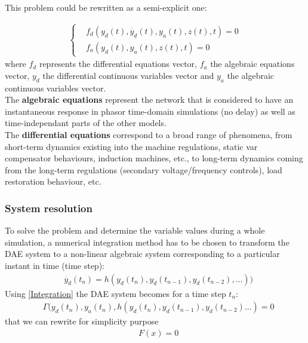 \documentclass[a4paper, 12pt]{report}
\begin{document}
This problem could be rewritten as a semi-explicit one:

\begin{equation}
\begin{aligned}
\begin{cases}
& f_d(y_d(t), \dot{y_d}(t), y_a(t), z(t), t) = 0 \\
& f_a(y_d(t), y_a(t), z(t), t) = 0
\end{cases}
\end{aligned}
\end{equation}  
where $f_d$ represents the differential equations vector, $f_a$ the algebraic equations vector, $y_d$ the differential continuous variables vector and $y_a$ the algebraic continuous variables vector. \\

The \textbf{algebraic equations} represent the network that is considered to have an instantaneous response in phasor time-domain simulations (no delay) as well as time-independant parts of the other models.\\

The \textbf{differential equations} correspond to a broad range of phenomena, from short-term dynamics existing into the machine regulations, static var compensator behaviours, induction machines, etc., to long-term dynamics coming from the long-term regulations (secondary voltage/frequency controls), load restoration behaviour, etc.

\subsubsection{System resolution}
\label{Dynawo_Solver_System_Resolution}

To solve the problem and determine the variable values during a whole simulation, a numerical integration method has to be chosen to transform the \ac{DAE} system to a non-linear algebraic system corresponding to a particular instant in time (time step):
\begin{equation}
\begin{aligned}
& \dot{y_d}(t_n) = h(y_d(t_n), y_d(t_{n-1}), y_d(t_{n-2}), ...))
\end{aligned}
\label{Integration}
\end{equation}
Using \eqref{Integration} the \ac{DAE} system becomes for a time step $t_n$:
\begin{equation}
\begin{aligned}
& \Gamma(y_d(t_n), y_a(t_n), h(y_d(t_n), y_d(t_{n-1}), y_d(t_{n-2}) ...) = 0
\end{aligned}
\end{equation}
that we can rewrite for simplicity purpose
\begin{equation}
\begin{aligned}
& F(x) = 0
\end{aligned}
\label{Correction}
\end{equation}
\end{document}
